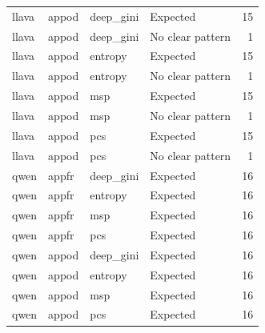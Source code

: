 \begin{table}[tbp]
\begin{tabular}{llllr}
llava & appod & deep\_gini & Expected & 15 \\
llava & appod & deep\_gini & No clear pattern & 1 \\
llava & appod & entropy & Expected & 15 \\
llava & appod & entropy & No clear pattern & 1 \\
llava & appod & msp & Expected & 15 \\
llava & appod & msp & No clear pattern & 1 \\
llava & appod & pcs & Expected & 15 \\
llava & appod & pcs & No clear pattern & 1 \\
qwen & appfr & deep\_gini & Expected & 16 \\
qwen & appfr & entropy & Expected & 16 \\
qwen & appfr & msp & Expected & 16 \\
qwen & appfr & pcs & Expected & 16 \\
qwen & appod & deep\_gini & Expected & 16 \\
qwen & appod & entropy & Expected & 16 \\
qwen & appod & msp & Expected & 16 \\
qwen & appod & pcs & Expected & 16 \\
\bottomrule
\end{tabular}
\end{table}
